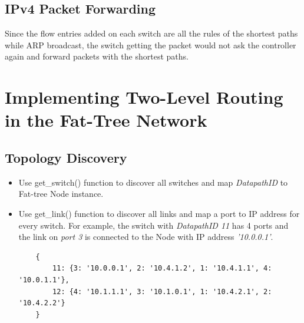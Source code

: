 \documentclass[a4paper,11pt]{article}
\begin{document}
\subsection{IPv4 Packet Forwarding}
Since the flow entries added on each switch are all the rules of the shortest paths while ARP broadcast, the switch getting the packet would not ask the controller again and forward packets with the shortest paths.

\section{Implementing Two-Level Routing in the Fat-Tree Network}
\subsection{Topology Discovery}
\begin{itemize}
    \item Use get\_switch() function to discover all switches and map \textit{DatapathID} to Fat-tree Node instance.
    \item Use get\_link() function to discover all links and map a port to IP address for every switch. For example, the switch with \textit{DatapathID 11} has 4 ports and the link on \textit{port 3} is connected to the Node with IP address \textit{'10.0.0.1'}.
    \begin{verbatim}
    {
        11: {3: '10.0.0.1', 2: '10.4.1.2', 1: '10.4.1.1', 4: '10.0.1.1'}, 
        12: {4: '10.1.1.1', 3: '10.1.0.1', 1: '10.4.2.1', 2: '10.4.2.2'}
    }
    \end{verbatim}
    
\end{itemize}
\end{document}
